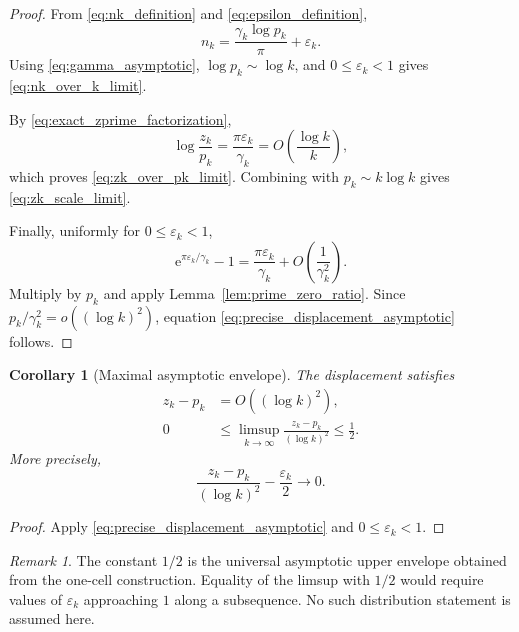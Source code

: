 \documentclass[11pt]{amsart}
\numberwithin{equation}{section}
\theoremstyle{plain}
\newtheorem{corollary}[theorem]{Corollary}
\theoremstyle{definition}
\theoremstyle{remark}
\newtheorem{remark}[theorem]{Remark}
\newcommand{\e}{\mathrm e}
\begin{document}
\begin{proof}
From \eqref{eq:nk_definition} and \eqref{eq:epsilon_definition},
\begin{equation}
 n_k
 =\frac{\gamma_k\log p_k}{\pi}+\varepsilon_k.
 \label{eq:nk_exact_epsilon}
\end{equation}
Using \eqref{eq:gamma_asymptotic},
$\log p_k\sim\log k$, and $0\leq\varepsilon_k<1$ gives
\eqref{eq:nk_over_k_limit}.

By \eqref{eq:exact_zprime_factorization},
\begin{equation}
 \log\frac{z_k}{p_k}
 =\frac{\pi\varepsilon_k}{\gamma_k}
 =O\left(\frac{\log k}{k}\right),
 \label{eq:log_ratio_rate}
\end{equation}
which proves \eqref{eq:zk_over_pk_limit}.  Combining with
$p_k\sim k\log k$ gives \eqref{eq:zk_scale_limit}.

Finally, uniformly for $0\leq\varepsilon_k<1$,
\begin{equation}
 \e^{\pi\varepsilon_k/\gamma_k}-1
 =\frac{\pi\varepsilon_k}{\gamma_k}
 +O\left(\frac{1}{\gamma_k^2}\right).
 \label{eq:uniform_exponential_expansion}
\end{equation}
Multiply by $p_k$ and apply Lemma~\ref{lem:prime_zero_ratio}.  Since
$p_k/\gamma_k^2=o((\log k)^2)$, equation
\eqref{eq:precise_displacement_asymptotic} follows.
\end{proof}

\begin{corollary}[Maximal asymptotic envelope]
\label{cor:maximal_asymptotic_envelope}
The displacement satisfies
\begin{align}
 z_k-p_k&=O((\log k)^2),
 \label{eq:displacement_big_o}
 \\
 0&\leq\limsup_{k\to\infty}
 \frac{z_k-p_k}{(\log k)^2}
 \leq\frac12.
 \label{eq:displacement_limsup_bound}
\end{align}
More precisely,
\begin{equation}
 \frac{z_k-p_k}{(\log k)^2}
 -\frac{\varepsilon_k}{2}
 \longrightarrow0.
 \label{eq:displacement_epsilon_limit}
\end{equation}
\end{corollary}

\begin{proof}
Apply \eqref{eq:precise_displacement_asymptotic} and
$0\leq\varepsilon_k<1$.
\end{proof}

\begin{remark}
\label{rem:upper_envelope_not_attained}
The constant $1/2$ is the universal asymptotic upper envelope obtained from
the one-cell construction.  Equality of the limsup with $1/2$ would require
values of $\varepsilon_k$ approaching $1$ along a subsequence.  No such
distribution statement is assumed here.
\end{remark}
\end{document}
